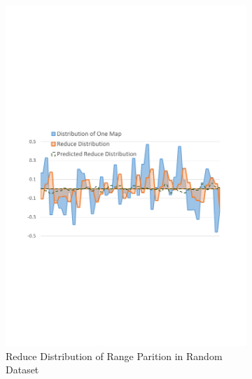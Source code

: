 \documentclass[10pt,twocolumn]{article}
\begin{document}
\begin{figure}
\begin{subfigure}[b]{0.32\linewidth}
		\includegraphics[width=\linewidth]{fig/range_pre_random}
		\caption{Reduce Distribution of Range Parition in Random Dataset}
		\label{fig:range_pre_random}
	\end{subfigure}
	\begin{subfigure}[b]{0.32\linewidth}

\end{subfigure}
\end{figure}
\end{document}
